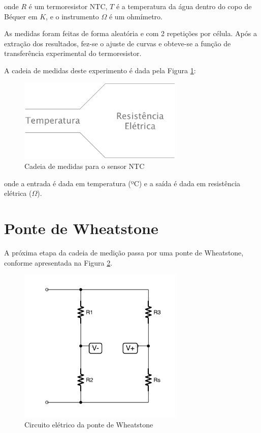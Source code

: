 \documentclass[a4paper]{instrumentacao}
\begin{document}
\noindent
onde $R$ é um termoresistor NTC, $T$ é a temperatura da água dentro do copo de Béquer em $K$, e o instrumento $\Omega$ é um ohmímetro.

As medidas foram feitas de forma aleatória e com 2 repetições por célula. Após a extração dos resultados, fez-se o ajuste de curvas e obteve-se a função de transferência experimental do termoresistor.

A cadeia de medidas deste experimento é dada pela Figura \ref{fig:ntc-cadeia-medidas}:

\begin{figure}[H]
\center
\includegraphics[width=0.7\textwidth]{CadeiaMedidas.pdf}
\caption{Cadeia de medidas para o sensor NTC}
\label{fig:ntc-cadeia-medidas}
\end{figure}

\noindent
onde a entrada é dada em temperatura (ºC) e a saída é dada em resistência elétrica ($\Omega$).



\section{Ponte de Wheatstone}

A próxima etapa da cadeia de medição passa por uma ponte de Wheatstone, conforme apresentada na Figura \ref{fig:wheatstone}.

\begin{figure}[H]
\center
\includegraphics[width=0.7\textwidth]{Wheatstone.pdf}
\caption{Circuito elétrico da ponte de Wheatstone}
\label{fig:wheatstone}
\end{figure}
\end{document}
